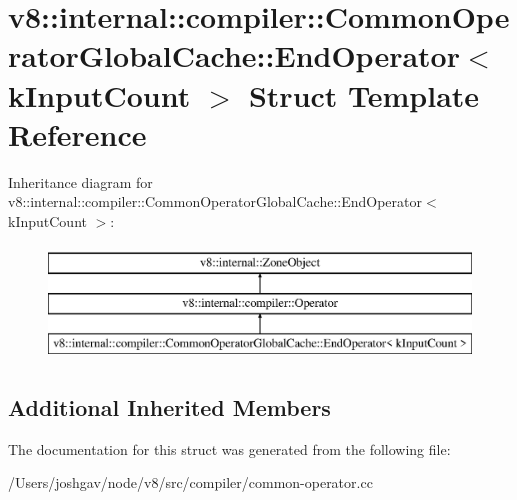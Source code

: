 \hypertarget{structv8_1_1internal_1_1compiler_1_1_common_operator_global_cache_1_1_end_operator}{}\section{v8\+:\+:internal\+:\+:compiler\+:\+:Common\+Operator\+Global\+Cache\+:\+:End\+Operator$<$ k\+Input\+Count $>$ Struct Template Reference}
\label{structv8_1_1internal_1_1compiler_1_1_common_operator_global_cache_1_1_end_operator}
Inheritance diagram for v8\+:\+:internal\+:\+:compiler\+:\+:Common\+Operator\+Global\+Cache\+:\+:End\+Operator$<$ k\+Input\+Count $>$\+:\begin{figure}[H]
\begin{center}
\leavevmode
\includegraphics[height=3.000000cm]{structv8_1_1internal_1_1compiler_1_1_common_operator_global_cache_1_1_end_operator}
\end{center}
\end{figure}
\subsection*{Additional Inherited Members}


The documentation for this struct was generated from the following file\+:\begin{DoxyCompactItemize}
\item 
/\+Users/joshgav/node/v8/src/compiler/common-\/operator.\+cc\end{DoxyCompactItemize}
